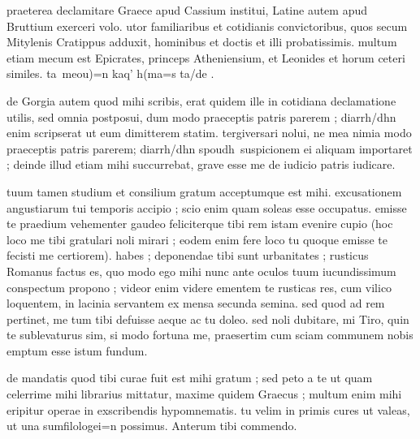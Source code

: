  praeterea declamitare Graece apud Cassium institui, Latine autem apud Bruttium exerceri volo. utor familiaribus et cotidianis convictoribus, quos secum Mitylenis Cratippus adduxit, hominibus et doctis et illi probatissimis. multum etiam mecum est Epicrates, princeps Atheniensium, et Leonides et horum ceteri similes. ta\ me\n ou)=n kaq' h(ma=s ta/de .

 de Gorgia autem quod mihi scribis, erat quidem ille in cotidiana declamatione utilis, sed omnia postposui, dum modo praeceptis patris parerem ; diarrh/dhn enim scripserat ut eum dimitterem statim. tergiversari nolui, ne mea nimia modo praeceptis patris parerem; diarrh/dhn spoudh\ suspicionem ei aliquam importaret ; deinde illud etiam mihi succurrebat, grave esse me de iudicio patris iudicare.

 tuum tamen studium et consilium gratum acceptumque est mihi. excusationem angustiarum tui temporis accipio ; scio enim quam soleas esse occupatus. emisse te praedium vehementer gaudeo feliciterque tibi rem istam evenire cupio (hoc loco me tibi gratulari noli mirari ; eodem enim fere loco tu quoque emisse te fecisti me certiorem). habes ; deponendae tibi sunt urbanitates ; rusticus Romanus factus es, quo modo ego mihi nunc ante oculos tuum iucundissimum conspectum propono ; videor enim videre ementem te rusticas res, cum vilico loquentem, in lacinia servantem ex mensa secunda semina. sed quod ad rem pertinet, me tum tibi defuisse aeque ac tu doleo. sed noli dubitare, mi Tiro, quin te sublevaturus sim, si modo fortuna me, praesertim cum sciam communem nobis emptum esse istum fundum.

 de mandatis quod tibi curae fuit est mihi gratum ; sed peto a te ut quam celerrime mihi librarius mittatur, maxime quidem Graecus ; multum enim mihi eripitur operae in exscribendis hypomnematis. tu velim in primis cures ut valeas, ut una sumfilologei=n possimus. Anterum tibi commendo.

